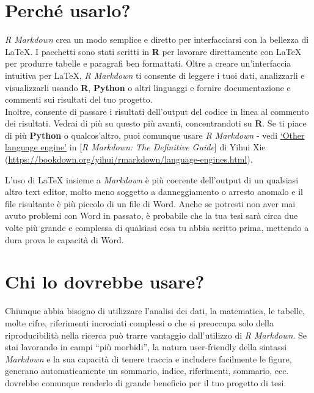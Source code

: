 \documentclass[a4paper, 11pt, nobind]{templates/ociamthesis}
\begin{document}
\hypertarget{perchuxe9-usarlo}{%
\section*{Perché usarlo?}\label{perchuxe9-usarlo}}

\emph{R Markdown} crea un modo semplice e diretto per interfacciarsi con la bellezza di LaTeX.
I pacchetti sono stati scritti in \textbf{R} per lavorare direttamente con LaTeX per produrre tabelle e paragrafi ben formattati.
Oltre a creare un'interfaccia intuitiva per LaTeX, \emph{R Markdown} ti consente di leggere i tuoi dati, analizzarli e visualizzarli usando \textbf{R}, \textbf{Python} o altri linguaggi e fornire documentazione e commenti sui risultati del tuo progetto.\\
Inoltre, consente di passare i risultati dell'output del codice in linea al commento dei risultati.
Vedrai di più su questo più avanti, concentrandoti su \textbf{R}.
Se ti piace di più \textbf{Python} o qualcos'altro, puoi comunque usare \emph{R Markdown} - vedi \href{https://bookdown.org/yihui/rmarkdown/language-engines.html}{`Other language engine'} in {[}\emph{R Markdown: The Definitive Guide}{]} di Yihui Xie (\url{https://bookdown.org/yihui/rmarkdown/language-engines.html}).

L'uso di LaTeX insieme a \emph{Markdown} è più coerente dell'output di un qualsiasi altro text editor, molto meno soggetto a danneggiamento o arresto anomalo e il file risultante è più piccolo di un file di Word.
Anche se potresti non aver mai avuto problemi con Word in passato, è probabile che la tua tesi sarà circa due volte più grande e complessa di qualsiasi cosa tu abbia scritto prima, mettendo a dura prova le capacità di Word.

\hypertarget{chi-lo-dovrebbe-usare}{%
\section*{Chi lo dovrebbe usare?}\label{chi-lo-dovrebbe-usare}}

Chiunque abbia bisogno di utilizzare l'analisi dei dati, la matematica, le tabelle, molte cifre, riferimenti incrociati complessi o che si preoccupa solo della riproducibilità nella ricerca può trarre vantaggio dall'utilizzo di \emph{R Markdown}.
Se stai lavorando in campi ``più morbidi'', la natura user-friendly della sintassi \emph{Markdown} e la sua capacità di tenere traccia e includere facilmente le figure, generano automaticamente un sommario, indice, riferimenti, sommario, ecc. dovrebbe comunque renderlo di grande beneficio per il tuo progetto di tesi.
\end{document}
